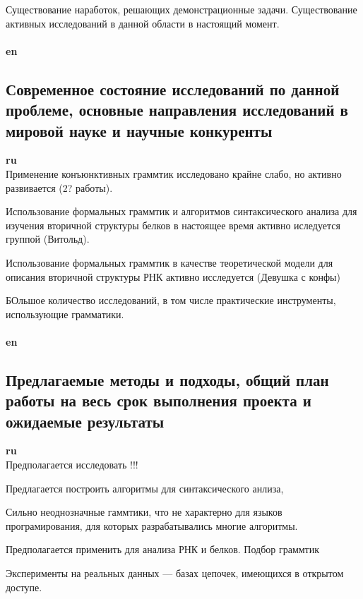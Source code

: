 \documentclass[12pt]{article}  %
\theoremstyle{remark}
\begin{document}
Существование наработок, решающих демонстрационные задачи.
Существование активных исследований в данной области в настоящий момент.
\\
\\
\textbf{en}\\


\subsection{Современное состояние исследований по данной проблеме, основные направления исследований в мировой науке и научные конкуренты}

\textbf{ru}\\
Применение конъюнктивных граммтик исследовано крайне слабо, но активно развивается (2? работы).

Использование формальных граммтик и алгоритмов синтаксического анализа для изучения вторичной структуры белков в настоящее время активно иследуется группой (Витольд).

Использование формальных граммтик в качестве теоретической модели для описания вторичной структуры РНК активно исследуется (Девушка с конфы)

БОльшое количество исследований, в том числе практические инструменты, использующие грамматики.
\\
\\
\textbf{en}\\



\subsection{Предлагаемые методы и подходы, общий план работы на весь срок выполнения проекта и ожидаемые результаты }

\textbf{ru}\\
Предполагается исследовать !!!

Предлагается построить алгоритмы для синтаксического анлиза,

Сильно неоднозначные гаммтики, что не характерно для языков програмирования, для которых разрабатывались многие алгоритмы.

Предполагается применить для анализа РНК и белков.
Подбор граммтик

Эксперименты на реальных данных --- базах цепочек, имеющихся в открытом доступе.
\end{document}
